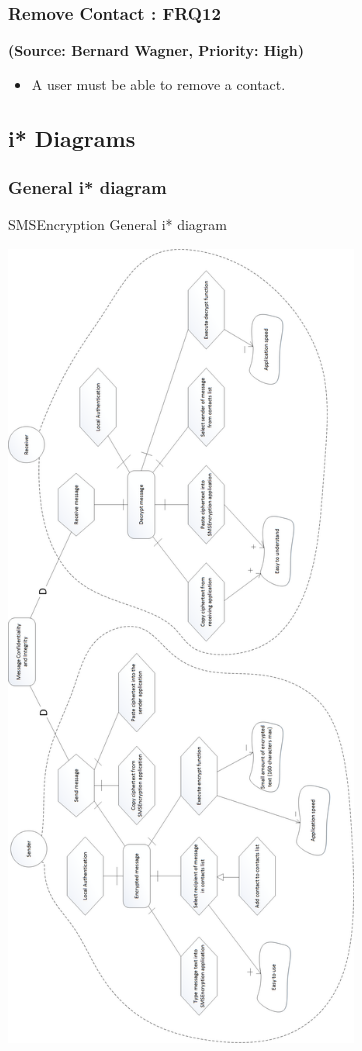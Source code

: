 \subsubsection{Remove Contact : FRQ12}
\textbf{(Source: Bernard Wagner, Priority: High)}
\begin{itemize}
\item A user must be able to remove a contact.
\end{itemize}


\subsection{i* Diagrams}
\subsubsection{General i* diagram}
SMSEncryption General i* diagram

\begin{center}
 \includegraphics[height=21cm]{diagrams/IStarDiagrams/SMSEncryptionIStarDiagram.png}
\end{center}
